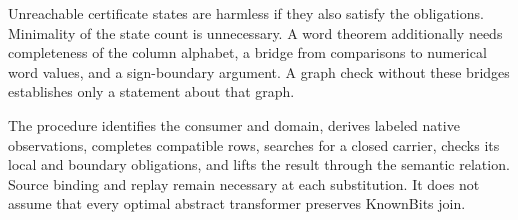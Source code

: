 Unreachable certificate states are harmless if they also satisfy the obligations. Minimality of the state count is unnecessary. A word theorem additionally needs completeness of the column alphabet, a bridge from comparisons to numerical word values, and a sign-boundary argument. A graph check without these bridges establishes only a statement about that graph.

The procedure identifies the consumer and domain, derives labeled native observations, completes compatible rows, searches for a closed carrier, checks its local and boundary obligations, and lifts the result through the semantic relation. Source binding and replay remain necessary at each substitution. It does not assume that every optimal abstract transformer preserves KnownBits join.
